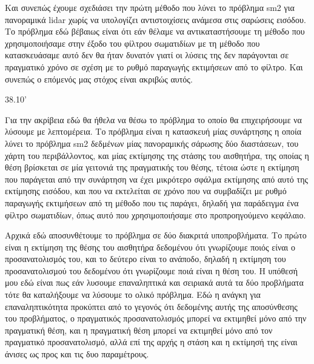 \documentclass[a4paper,10pt]{article}
\begin{document}
Και συνεπώς έχουμε σχεδιάσει την πρώτη μέθοδο που λύνει το πρόβλημα sm2 για
πανοραμικά lidar χωρίς να υπολογίζει αντιστοιχίσεις ανάμεσα στις σαρώσεις
εισόδου. Το πρόβλημα εδώ βέβαιως είναι ότι εάν θέλαμε να αντικαταστήσουμε τη
μέθοδο που χρησιμοποιήσαμε στην έξοδο του φίλτρου σωματιδίων με τη μέθοδο που
κατασκευάσαμε αυτό δεν θα ήταν δυνατόν γιατί οι λύσεις της δεν παράγονται σε
πραγματικό χρόνο σε σχέση με το ρυθμό παραγωγής εκτιμήσεων από το φίλτρο.
Και συνεπώς ο επόμενός μας στόχος είναι ακριβώς αυτός.


38.10'



Για την ακρίβεια εδώ θα ήθελα να θέσω το πρόβλημα το οποίο θα επιχειρήσουμε
να λύσουμε με λεπτομέρεια. Το πρόβλημα είναι η κατασκευή μίας συνάρτησης η
οποία λύνει το πρόβλημα sm2 δεδμένων μίας πανοραμικής σάρωσης δύο διαστάσεων,
του χάρτη του περιβάλλοντος, και μίας εκτίμησης της στάσης του αισθητήρα,
της οποίας η θέση βρίσκεται σε μία γειτονιά της πραγματικής του θέσης,
τέτοια ώστε η εκτίμηση που παράγεται από την συνάρτηση να έχει μικρότερο σφάλμα
εκτίμησης από αυτό της εκτίμησης εισόδου, και που να εκτελείται σε χρόνο που
να συμβαδίζει με ρυθμό παραγωγής εκτιμήσεων από τη μέθοδο που τις παράγει,
δηλαδή για παράδειγμα ένα φίλτρο σωματιδίων, όπως αυτό που χρησιμοποιήσαμε
στο προπροηγούμενο κεφάλαιο.


Αρχικά εδώ αποσυνθέτουμε το πρόβλημα σε δύο διακριτά υποπροβλήματα. Το πρώτο
είναι η εκτίμηση της θέσης του αισθητήρα δεδομένου ότι γνωρίζουμε ποιός είναι
ο προσανατολισμός του, και το δεύτερο είναι το ανάποδο, δηλαδή η εκτίμηση του
προσανατολισμού του δεδομένου ότι γνωρίζουμε ποιά είναι η θέση του. Η υπόθεσή
μου εδώ είναι πως εάν λυσουμε επαναληπτικά και σειριακά αυτά τα δύο προβλήματα
τότε θα καταλήξουμε να λύσουμε το ολικό πρόβλημα. Εδώ η ανάγκη για επαναληπτικότητα
προκύπτει από το γεγονός ότι δεδομένης αυτής της αποσύνθεσης του προβλήματος, ο
πραγματικός προσανατολισμός μπορεί να εκτιμηθεί μόνο από την πραγματική θέση,
και η πραγματική θέση μπορεί να εκτιμηθεί μόνο από τον πραγματικό
προσανατολισμό, αλλά επί της αρχής η στάση και η εκτίμησή της είναι άνισες
ως προς και τις δυο παραμέτρους.
\end{document}
